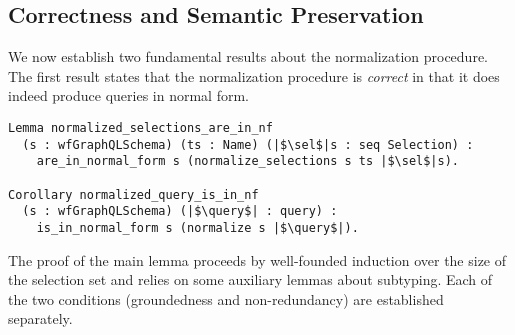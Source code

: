 
\iffalse
\begin{verbatim}
 Definition normalize_queries (s : wfGraphQLSchema)
                             (type_in_scope : Name)
                             (queries : seq Query) :
                                         seq Query :=
    if is_object_type s type_in_scope then
        normalize s type_in_scope queries
    else
        [seq on t { normalize s t queries } |
            t <- get_possible_types s type_in_scope].

\end{verbatim}
\fi





\subsection{Correctness and Semantic Preservation}
We now establish two fundamental results about the normalization
procedure. The first result states that the normalization procedure
is {\em correct} in that it does indeed produce queries in normal
form.
%
\begin{verbatim}
Lemma normalized_selections_are_in_nf
  (s : wfGraphQLSchema) (ts : Name) (|$\sel$|s : seq Selection) :
    are_in_normal_form s (normalize_selections s ts |$\sel$|s).

Corollary normalized_query_is_in_nf 
  (s : wfGraphQLSchema) (|$\query$| : query) :
    is_in_normal_form s (normalize s |$\query$|).
\end{verbatim}
%
\noindent The proof of the main lemma proceeds by well-founded
induction over the size of the selection set and relies on some
auxiliary lemmas about subtyping. Each of the two conditions
(groundedness and non-redundancy) are established separately.

